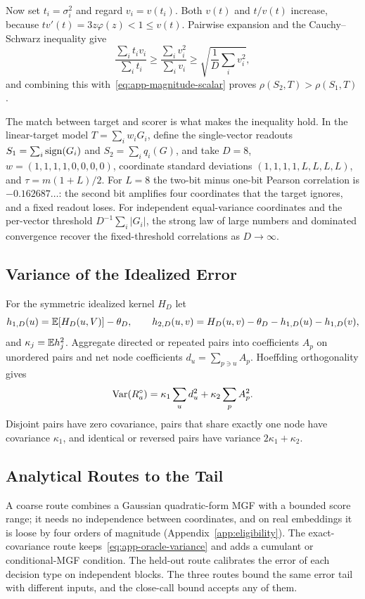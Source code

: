 Now set $t_i=\sigma_i^2$ and regard $v_i=v(t_i)$. Both $v(t)$ and $t/v(t)$ increase, because $tv'(t)=3z\varphi(z)<1\le v(t)$. Pairwise expansion and the Cauchy--Schwarz inequality give
\begin{equation}
\frac{\sum_it_iv_i}{\sum_it_i}\ge\frac{\sum_iv_i^2}{\sum_iv_i}\ge\sqrt{\frac1D\sum_iv_i^2},
\end{equation}
and combining this with~\eqref{eq:app-magnitude-scalar} proves $\rho(S_2,T)>\rho(S_1,T)$.

The match between target and scorer is what makes the inequality hold. In the linear-target model $T=\sum_iw_iG_i$, define the single-vector readouts $S_1=\sum_i\operatorname{sign}(G_i)$ and $S_2=\sum_iq_i(G)$, and take $D=8$, $w=(1,1,1,1,0,0,0,0)$, coordinate standard deviations $(1,1,1,1,L,L,L,L)$, and $\tau=m(1+L)/2$. For $L=8$ the two-bit minus one-bit Pearson correlation is $-0.162687\ldots$: the second bit amplifies four coordinates that the target ignores, and a fixed readout loses. For independent equal-variance coordinates and the per-vector threshold $D^{-1}\sum_i|G_i|$, the strong law of large numbers and dominated convergence recover the fixed-threshold correlations as $D\to\infty$.

\subsection{Variance of the Idealized Error}

For the symmetric idealized kernel $H_D$ let
\begin{equation}
h_{1,D}(u)=\mathbb{E}[H_D(u,V)]-\theta_D,\qquad
h_{2,D}(u,v)=H_D(u,v)-\theta_D-h_{1,D}(u)-h_{1,D}(v),
\end{equation}
and $\kappa_j=\mathbb{E} h_j^2$. Aggregate directed or repeated pairs into coefficients $A_p$ on unordered pairs and net node coefficients $d_u=\sum_{p\ni u}A_p$. Hoeffding orthogonality gives
\begin{equation}
\operatorname{Var}(R_a^\circ)=\kappa_1\sum_ud_u^2+\kappa_2\sum_pA_p^2.
\label{eq:app-oracle-variance}
\end{equation}
Disjoint pairs have zero covariance, pairs that share exactly one node have covariance $\kappa_1$, and identical or reversed pairs have variance $2\kappa_1+\kappa_2$.

\subsection{Analytical Routes to the Tail}

A coarse route combines a Gaussian quadratic-form MGF with a bounded score range; it needs no independence between coordinates, and on real embeddings it is loose by four orders of magnitude (Appendix~\ref{app:eligibility}). The exact-covariance route keeps~\eqref{eq:app-oracle-variance} and adds a cumulant or conditional-MGF condition. The held-out route calibrates the error of each decision type on independent blocks. The three routes bound the same error tail with different inputs, and the close-call bound accepts any of them.

